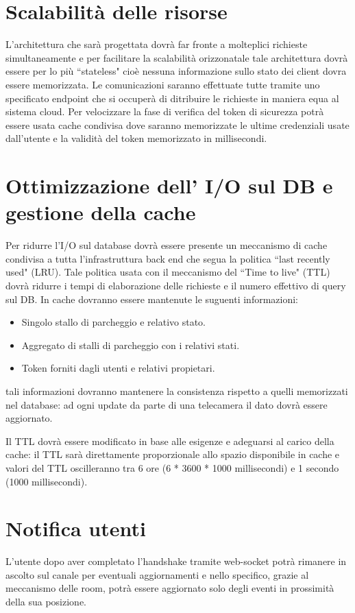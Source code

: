 \section{Scalabilità delle risorse}
L'architettura che sarà progettata dovrà far fronte a molteplici richieste simultaneamente e per facilitare la scalabilità orizzonatale tale architettura dovrà essere per lo più ``stateless" cioè nessuna informazione sullo stato dei client dovra essere memorizzata. Le comunicazioni saranno effettuate tutte tramite uno specificato endpoint che si occuperà di ditribuire le richieste in maniera equa al sistema cloud. Per velocizzare la fase di verifica del token di sicurezza potrà essere usata cache condivisa dove saranno memorizzate le ultime credenziali usate dall'utente e la validità del token memorizzato in millisecondi. 



\section{Ottimizzazione dell' I/O sul DB e gestione della cache}
Per ridurre l'I/O sul database dovrà essere presente un meccanismo di cache condivisa a tutta l'infrastruttura back end che segua la politica ``last recently used" (LRU). Tale politica usata con il meccanismo del ``Time to live" (TTL) dovrà ridurre i tempi di elaborazione delle richieste e il numero effettivo di query sul DB. In cache dovranno essere mantenute le suguenti informazioni:

\begin{itemize}
	\item Singolo stallo di parcheggio e relativo stato.
	\item Aggregato di stalli di parcheggio con i relativi stati.
	\item Token forniti dagli utenti e relativi propietari.
\end{itemize}

tali informazioni dovranno mantenere la consistenza rispetto a quelli memorizzati nel database: ad ogni update da parte di una telecamera il dato dovrà essere aggiornato. 

Il TTL dovrà essere modificato in base alle esigenze e adeguarsi al carico della cache: il TTL sarà direttamente proporzionale allo spazio disponibile in cache e valori del TTL oscilleranno tra 6 ore (6 * 3600 * 1000 millisecondi) e 1 secondo (1000 millisecondi).


\section{Notifica utenti} 
L'utente dopo aver completato l'handshake tramite web-socket potrà rimanere in ascolto sul canale per eventuali aggiornamenti e nello specifico, grazie al meccanismo delle room, potrà essere aggiornato solo degli eventi in prossimità della sua posizione. 
